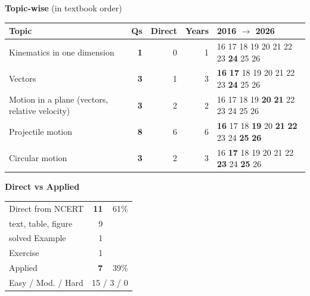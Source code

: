 {\small\textbf{\color{crimson}Topic-wise} (in textbook order)\par\smallskip
\begin{tabularx}{\linewidth}{@{}>{\raggedright\arraybackslash}Xrrrl@{}}\toprule
Topic & Qs & Direct & Years & 2016 $\rightarrow$ 2026\\\midrule
Kinematics in one dimension & \textbf{1} & 0 & 1 & {\scriptsize {\color{gray!45}16} {\color{gray!45}17} {\color{gray!45}18} {\color{gray!45}19} {\color{gray!45}20} {\color{gray!45}21} {\color{gray!45}22} {\color{gray!45}23} \textbf{24} {\color{gray!45}25} {\color{gray!45}26}}\\
Vectors & \textbf{3} & 1 & 3 & {\scriptsize \textbf{16} \textbf{17} {\color{gray!45}18} {\color{gray!45}19} {\color{gray!45}20} {\color{gray!45}21} {\color{gray!45}22} {\color{gray!45}23} \textbf{24} {\color{gray!45}25} {\color{gray!45}26}}\\
Motion in a plane (vectors, relative velocity) & \textbf{3} & 2 & 2 & {\scriptsize {\color{gray!45}16} {\color{gray!45}17} {\color{gray!45}18} {\color{gray!45}19} \textbf{20} \textbf{21} {\color{gray!45}22} {\color{gray!45}23} {\color{gray!45}24} {\color{gray!45}25} {\color{gray!45}26}}\\
Projectile motion & \textbf{8} & 6 & 6 & {\scriptsize \textbf{16} {\color{gray!45}17} {\color{gray!45}18} \textbf{19} {\color{gray!45}20} \textbf{21} \textbf{22} {\color{gray!45}23} {\color{gray!45}24} \textbf{25} \textbf{26}}\\
Circular motion & \textbf{3} & 2 & 3 & {\scriptsize {\color{gray!45}16} \textbf{17} {\color{gray!45}18} {\color{gray!45}19} {\color{gray!45}20} {\color{gray!45}21} {\color{gray!45}22} \textbf{23} {\color{gray!45}24} \textbf{25} {\color{gray!45}26}}\\
\bottomrule\end{tabularx}}\par\medskip
\begin{minipage}[t]{0.34\linewidth}{\small\textbf{\color{crimson}Direct vs Applied}\par\smallskip
\begin{tabular}{@{}lrr@{}}\toprule
Direct from NCERT & \textbf{11} & 61\%\\
\quad text, table, figure & 9 &\\
\quad solved Example & 1 &\\
\quad Exercise & 1 &\\
Applied & \textbf{7} & 39\%\\\midrule
Easy / Mod. / Hard & \multicolumn{2}{r}{15 / 3 / 0}\\\bottomrule
\end{tabular}}\end{minipage}\hfill
